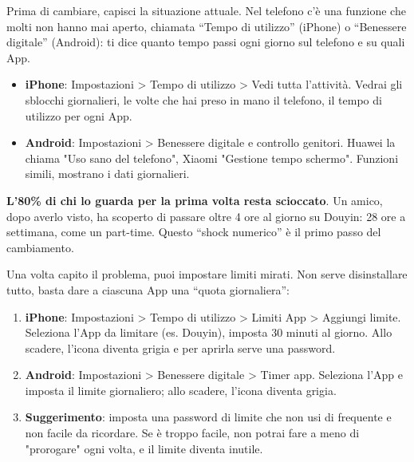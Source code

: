 


Prima di cambiare, capisci la situazione attuale. Nel telefono c'è una funzione che molti non hanno mai aperto, chiamata “Tempo di utilizzo” (iPhone) o “Benessere digitale” (Android): ti dice quanto tempo passi ogni giorno sul telefono e su quali App.

\begin{itemize}
  \item \textbf{iPhone}: Impostazioni > Tempo di utilizzo > Vedi tutta l'attività. Vedrai gli sblocchi giornalieri, le volte che hai preso in mano il telefono, il tempo di utilizzo per ogni App.
  \item \textbf{Android}: Impostazioni > Benessere digitale e controllo genitori. Huawei la chiama "Uso sano del telefono", Xiaomi "Gestione tempo schermo". Funzioni simili, mostrano i dati giornalieri.
\end{itemize}

\textbf{L'80\% di chi lo guarda per la prima volta resta scioccato}. Un amico, dopo averlo visto, ha scoperto di passare oltre 4 ore al giorno su Douyin: 28 ore a settimana, come un part-time. Questo “shock numerico” è il primo passo del cambiamento.


Una volta capito il problema, puoi impostare limiti mirati. Non serve disinstallare tutto, basta dare a ciascuna App una “quota giornaliera”:

\begin{enumerate}
  \item \textbf{iPhone}: Impostazioni > Tempo di utilizzo > Limiti App > Aggiungi limite. Seleziona l'App da limitare (es. Douyin), imposta 30 minuti al giorno. Allo scadere, l'icona diventa grigia e per aprirla serve una password.
  \item \textbf{Android}: Impostazioni > Benessere digitale > Timer app. Seleziona l'App e imposta il limite giornaliero; allo scadere, l'icona diventa grigia.
  \item \textbf{Suggerimento}: imposta una password di limite che non usi di frequente e non facile da ricordare. Se è troppo facile, non potrai fare a meno di "prorogare" ogni volta, e il limite diventa inutile.
\end{enumerate}

